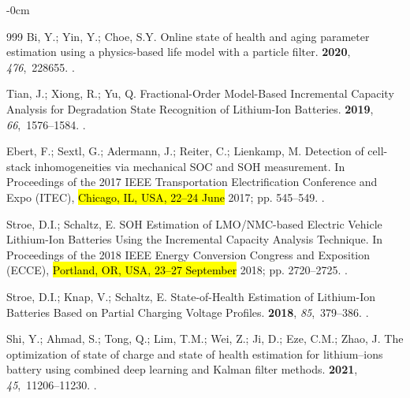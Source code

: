 \documentclass[energies,article,accept,pdftex,moreauthors]{Definitions/mdpi}
\begin{document}
\begin{adjustwidth}{-\extralength}{0cm}
\begin{thebibliography}{999}
Bi, Y.; Yin, Y.; Choe, S.Y.
\newblock Online state of health and aging parameter estimation using a
  physics-based life model with a particle filter.
 {\bf 2020}, {\em 476},~228655.
.

Tian, J.; Xiong, R.; Yu, Q.
\newblock Fractional-Order Model-Based Incremental Capacity Analysis for
  Degradation State Recognition of Lithium-Ion Batteries.
 {\bf 2019}, {\em
  66},~1576--1584.
.

Ebert, F.; Sextl, G.; Adermann, J.; Reiter, C.; Lienkamp, M.
\newblock Detection of cell-stack inhomogeneities via mechanical SOC and SOH
  measurement.
\newblock In Proceedings of the 2017 IEEE Transportation Electrification
  Conference and Expo (ITEC), \hl{Chicago, IL, USA, 22--24 June }2017; pp. 545--549.
.



Stroe, D.I.; Schaltz, E.
\newblock SOH Estimation of LMO/NMC-based Electric Vehicle Lithium-Ion
  Batteries Using the Incremental Capacity Analysis Technique.
\newblock In Proceedings of the 2018 IEEE Energy Conversion Congress and
  Exposition (ECCE),\hl{ Portland, OR, USA, 23--27 September} 2018; pp. 2720--2725.
.

Stroe, D.I.; Knap, V.; Schaltz, E.
\newblock State-of-Health Estimation of Lithium-Ion Batteries Based on Partial
  Charging Voltage Profiles.
 {\bf 2018}, {\em 85},~379--386.
.

Shi, Y.; Ahmad, S.; Tong, Q.; Lim, T.M.; Wei, Z.; Ji, D.; Eze, C.M.; Zhao, J.
\newblock The optimization of state of charge and state of health estimation
  for lithium--ions battery using combined deep learning and Kalman filter
  methods.
 {\bf 2021}, {\em
  45},~11206--11230.
.


\end{thebibliography}
\end{adjustwidth}
\end{document}
